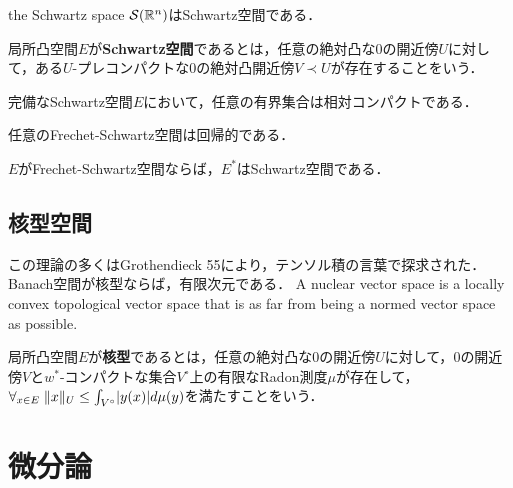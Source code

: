 \documentclass[uplatex,dvipdfmx]{jsreport}
\begin{document}
\begin{example}
    the Schwartz space $\mathcal{S}(\mathbb{R}^n)$はSchwartz空間である．
\end{example}

\begin{definition}
    局所凸空間$E$が\textbf{Schwartz空間}であるとは，任意の絶対凸な$0$の開近傍$U$に対して，ある$U$-プレコンパクトな$0$の絶対凸開近傍$V\prec U$が存在することをいう．
\end{definition}

\begin{lemma}
    完備なSchwartz空間$E$において，任意の有界集合は相対コンパクトである．
\end{lemma}

\begin{theorem}
    任意のFrechet-Schwartz空間は回帰的である．
\end{theorem}

\begin{theorem}
    $E$がFrechet-Schwartz空間ならば，$E^*$はSchwartz空間である．
\end{theorem}

\subsection{核型空間}

\begin{tcolorbox}[colframe=ForestGreen, colback=ForestGreen!10!white,breakable,colbacktitle=ForestGreen!40!white,coltitle=black,fonttitle=\bfseries\sffamily,
title=]
    この理論の多くはGrothendieck 55により，テンソル積の言葉で探求された．
    Banach空間が核型ならば，有限次元である．
    A nuclear vector space is a locally convex topological vector space that is as far from being a normed vector space as possible.
\end{tcolorbox}

\begin{definition}[nuclear]
    局所凸空間$E$が\textbf{核型}であるとは，任意の絶対凸な$0$の開近傍$U$に対して，$0$の開近傍$V$と$w^*$-コンパクトな集合$V^\circ$上の有限なRadon測度$\mu$が存在して，$\forall_{x\in E}\;\|x\|_U\le\int_{V^\circ}\lvert y(x)\rvert d\mu(y)$を満たすことをいう．
\end{definition}

\section{微分論}
\end{document}
